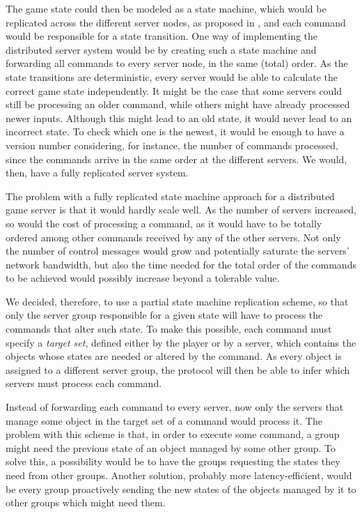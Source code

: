 \documentclass[]{usiinfprospectus}
\begin{document}
The game state could then be modeled as a state machine, which would be replicated across the different server nodes, as proposed in \cite{lamport1978ird,schneider1990ift,lampson1996hbh}, and each command would be responsible for a state transition. One way of implementing the distributed server system would be by creating such a state machine and forwarding all commands to every server node, in the same (total) order. As the state transitions are deterministic, every server would be able to calculate the correct game state independently. It might be the case that some servers could still be processing an older command, while others might have already processed newer inputs. Although this might lead to an old state, it would never lead to an incorrect state. To check which one is the newest, it would be enough to have a version number considering, for instance, the number of commands processed, since the commands arrive in the same order at the different servers. We would, then, have a fully replicated server system.

The problem with a fully replicated state machine approach for a distributed game server is that it would hardly scale well. As the number of servers increased, so would the cost of processing a command, as it would have to be totally ordered among other commands received by any of the other servers. Not only the number of control messages would grow and potentially saturate the servers' network bandwidth, but also the time needed for the total order of the commands to be achieved would possibly increase beyond a tolerable value.

We decided, therefore, to use a partial state machine replication scheme, so that only the server group responsible for a given state will have to process the commands that alter such state. To make this possible, each command must specify a \emph{target set}, defined either by the player or by a server, which contains the objects whose states are needed or altered by the command. As every object is assigned to a different server group, the protocol will then be able to infer which servers must process each command.

Instead of forwarding each command to every server, now only the servers that manage some object in the target set of a command would process it. The problem with this scheme is that, in order to execute some command, a group might need the previous state of an object managed by some other group. To solve this, a possibility would be to have the groups requesting the states they need from other groups. Another solution, probably more latency-efficient, would be every group proactively sending the new states of the objects managed by it to other groups which might need them.
\end{document}
